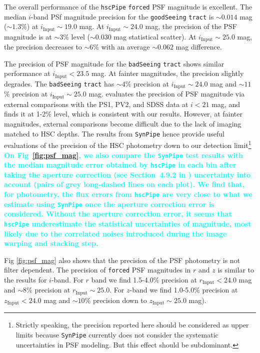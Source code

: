 \documentclass[useamsfonts]{pasj01}
\def\hscpipe{\texttt{hscPipe}}
\def\synpipe{\texttt{SynPipe}}
\def\forced{\texttt{forced}}
\def\tract{\texttt{tract}}
\newcommand{\song}[1]{\textcolor{cyan} {\textbf{#1}}}
\begin{document}
    The overall performance of the \hscpipe{} \forced{} PSF magnitude is excellent. 
    The median $i$-band PSf magnitude precision for the \texttt{goodSeeing} \tract{} 
    is ${\sim}0.014$ mag (${\sim}1.3$\%) at $i_{\mathrm{Input}}{\sim}19.0$ mag. 
    At $i_{\mathrm{Input}}{\sim}24.0$ mag, the precision of the PSF magnitude is 
    at ${\sim}3$\% level (${\sim}0.030$ mag statistical scatter).
    At $i_{\mathrm{Input}}{\sim}25.0$ mag, the precision decreases to
    ${\sim}6$\% with an average ${\sim}0.062$ mag difference.
    
    The precision of PSF magnitude for the \texttt{badSeeing} \tract{} shows similar 
    performance at $i_{\mathrm{Input}}<23.5$ mag. 
    At fainter magnitudes, the precision slightly degrades. 
    The \texttt{badSeeing} \tract{} has ${\sim}4$\% precision at
    $i_{\mathrm{Input}}{\sim}24.0$ mag and ${\sim}11$\% precision at
    $i_{\mathrm{Input}}{\sim}25.0$ mag.
    \citet{HSCDR1} evaluates the precision of PSF magnitude via external comparisons
    with the PS1, PV2, and SDSS data at $i<21$ mag, and finds it at 1-2\% level,
    which is consistent with our results. 
    However, at fainter magnitudes, external comparisons become difficult due to the 
    lack of imaging matched to HSC depths.
    The results from \synpipe{} hence provide useful evaluations of the precision of 
    the HSC photometry down to our detection limit\footnote{Strictly speaking, the 
    precision reported here should be considered as upper limits because 
    \synpipe{} currently does not consider the systematic uncertainties in PSF 
    modeling. But this effect should be subdominant.}
    \song{
    On Fig~\ref{fig:psf_mag}, we also compare the \synpipe{} test results with the 
    median \psf{} magnitude error obtained by \hscpipe{} in each bin after taking 
    the aperture correction (see Section~4.9.2 in \citealt{Bosch2017}) uncertainty 
    into account (pairs of grey long-dashed lines on each plot). 
    We find that, for \psf{} photometry, the flux errors from \hscpipe{} are very 
    close to what we estimate using \synpipe{} once the aperture correction 
    error is considered.
    Without the aperture correction error, it seems that \hscpipe{} underestimate 
    the statistical uncertainties of \psf{} magnitude, most likely due to the 
    correlated noises introduced during the image warping and stacking step.
    }

    Fig \ref{fig:psf_mag} also shows that the precision of the PSF photometry is 
    not filter dependent. 
    The precision of \forced{} PSF magnitudes in $r$ and $z$ is similar to the results
    for $i$-band. 
    For $r$ band we find 1.5-4.0\% precision at $r_{\mathrm{Input}} < 24.0$ mag and 
    ${\sim}8$\% precision at $r_{\mathrm{Input}}{\sim}25.0$. 
    For $z$-band we find 1.0-5.0\% precision at $z_{\mathrm{Input}} < 24.0$ mag and 
    ${\sim}10$\% precision down to $z_{\mathrm{Input}}{\sim}25.0$ mag).
    
\end{document}
